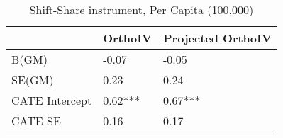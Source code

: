 \begin{table}\centering\caption{Shift-Share instrument, Per Capita (100,000)}\begin{tabular}{lll}
\toprule
                & OrthoIV   & Projected OrthoIV   \\
\midrule
 B(GM)          & -0.07     & -0.05               \\
 SE(GM)         & 0.23      & 0.24                \\
 CATE Intercept & 0.62***   & 0.67***             \\
 CATE SE        & 0.16      & 0.17                \\
\bottomrule
\end{tabular}\end{table}